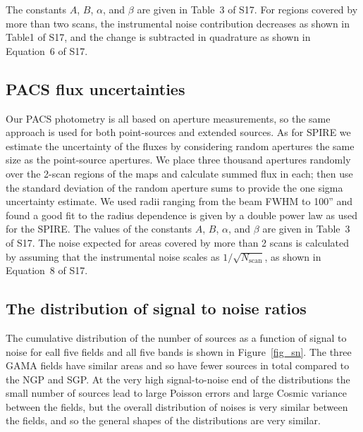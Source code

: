 \documentclass[useAMS,usenatbib]{mn2e}
\begin{document}
The constants $A$, $B$, $\alpha$, and $\beta$  are given in Table~3 of S17. 
For regions covered by more than two scans, the instrumental noise contribution
decreases as shown in Table1 of S17, and the change is subtracted in
quadrature as shown in Equation~6 of S17. 

\subsection{PACS flux uncertainties} 

Our PACS photometry is all based on aperture measurements, so the same
approach is used for both point-sources and extended sources. As for
SPIRE we estimate the uncertainty of the fluxes by considering random
apertures the same size as the point-source apertures. We place three
thousand apertures randomly over the 2-scan regions of the maps and
calculate summed flux in each; then use the standard deviation of the
random aperture sums to provide the one sigma uncertainty estimate. We
used radii ranging from the beam FWHM to 100'' and found a good fit to
the radius dependence is given by a double power law as used for the
SPIRE. The values of the constants $A$, $B$, $\alpha$, and $\beta$ are
given in Table~3 of S17. The noise expected for areas covered by more
than 2 scans is calculated by assuming that the instrumental noise
scales as $1/\sqrt{N_{\mathrm{scan}}}$, as shown in Equation~8 of
S17. 

\subsection{The distribution of signal to noise ratios} 

The cumulative distribution of the number of sources as a function of
signal to noise for eall five fields and all five bands is shown in
Figure~\ref{fig_sn}. The three GAMA fields have similar areas and so
have fewer sources in total compared to the NGP and SGP. At the very high
signal-to-noise end of the distributions the small number of sources
lead to large Poisson errors and large Cosmic variance between the
fields, but the overall
distribution of noises is very similar between the fields, and so the
general shapes of the distributions are very similar. 
\end{document}
